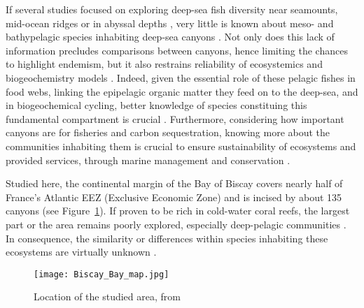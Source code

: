 
If several studies focused on exploring deep-sea fish diversity near seamounts, mid-ocean ridges or in abyssal depths \citep{cook2013,sutton2013}, very little is known about meso- and bathypelagic species inhabiting deep-sea canyons \citep{kenchington2020}. Not only does this lack of information precludes comparisons between canyons, hence limiting the chances to highlight endemism, but it also restrains reliability of ecosystemics and biogeochemistry models \citep{davison2015,kenchington2020}. Indeed, given the essential role of these pelagic fishes in food webs, linking the epipelagic organic matter they feed on to the deep-sea, and in biogeochemical cycling, better knowledge of species constituing this fundamental compartment is crucial \citep{davison2015,gaskett2001}. Furthermore, considering how important canyons are for fisheries and carbon sequestration, knowing more about the communities inhabiting them is crucial to ensure sustainability of ecosystems and provided services, through marine management and conservation \citep{fernandez-arcaya2017,vandenbeld2017a}.

Studied here, the continental margin of the Bay of Biscay covers nearly half of France's Atlantic EEZ (Exclusive Economic Zone) and is incised by about 135 canyons \citep{bourillet2006,spitz2019,vandenbeld2017} (see Figure~\ref{fig:bbm}). If proven to be rich in cold-water coral reefs, the largest part or the area remains poorly explored, especially deep-pelagic communities \citep{garcia2021,vandenbeld2017a,webb2010}. In consequence, the similarity or differences within species inhabiting these ecosystems are virtually unknown \citep{kenchington2020}. 

\begin{figure} [!htbp]
	\begin{center}
		\texttt{[image: Biscay\_Bay\_map.jpg]}
	\end{center}
	\caption{Location of the studied area, from \citep{mulder2012}}
	\label{fig:bbm}
\end{figure}

